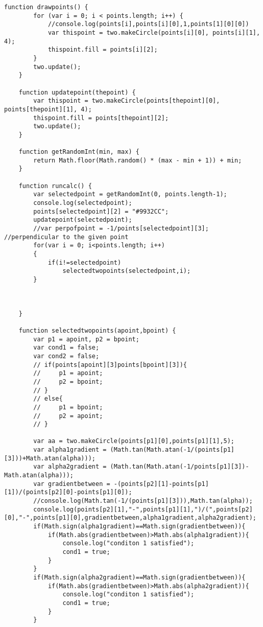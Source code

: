 \documentclass[letterpaper, 10 pt, conference]{ieeeconf}
\begin{document}
\begin{lstlisting}[style=htmlcssjs]
    function drawpoints() {
        for (var i = 0; i < points.length; i++) {
            //console.log(points[i],points[i][0],1,points[1][0][0])
            var thispoint = two.makeCircle(points[i][0], points[i][1], 4);
            thispoint.fill = points[i][2];
        }
        two.update();
    }
    
    function updatepoint(thepoint) {
        var thispoint = two.makeCircle(points[thepoint][0], points[thepoint][1], 4);
        thispoint.fill = points[thepoint][2];
        two.update();
    }
    
    function getRandomInt(min, max) {
        return Math.floor(Math.random() * (max - min + 1)) + min;
    }
    
    function runcalc() {
        var selectedpoint = getRandomInt(0, points.length-1);
        console.log(selectedpoint);
        points[selectedpoint][2] = "#9932CC";
        updatepoint(selectedpoint);
        //var perpofpoint = -1/points[selectedpoint][3]; //perpendicular to the given point
        for(var i = 0; i<points.length; i++)
        {
            if(i!=selectedpoint)
                selectedtwopoints(selectedpoint,i);
        }
    
    
    
    }
    
    function selectedtwopoints(apoint,bpoint) {
        var p1 = apoint, p2 = bpoint;
        var cond1 = false;
        var cond2 = false;
        // if(points[apoint][3]points[bpoint][3]){
        //     p1 = apoint;
        //     p2 = bpoint;
        // }
        // else{
        //     p1 = bpoint;
        //     p2 = apoint;
        // }
    
        var aa = two.makeCircle(points[p1][0],points[p1][1],5);
        var alpha1gradient = (Math.tan(Math.atan(-1/(points[p1][3]))+Math.atan(alpha)));
        var alpha2gradient = (Math.tan(Math.atan(-1/points[p1][3])-Math.atan(alpha)));
        var gradientbetween = -(points[p2][1]-points[p1][1])/(points[p2][0]-points[p1][0]);
        //console.log(Math.tan(-1/(points[p1][3])),Math.tan(alpha));
        console.log(points[p2][1],"-",points[p1][1],")/(",points[p2][0],"-",points[p1][0],gradientbetween,alpha1gradient,alpha2gradient);
        if(Math.sign(alpha1gradient)==Math.sign(gradientbetween)){
            if(Math.abs(gradientbetween)>Math.abs(alpha1gradient)){
                console.log("conditon 1 satisfied");
                cond1 = true;
            }
        }
        if(Math.sign(alpha2gradient)==Math.sign(gradientbetween)){
            if(Math.abs(gradientbetween)>Math.abs(alpha2gradient)){
                console.log("conditon 1 satisfied");
                cond1 = true;
            }
        }
    

\end{lstlisting}
\end{document}
